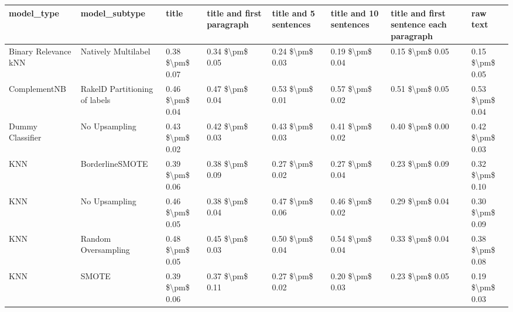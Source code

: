 \begin{tabular}{llllllll}
\toprule
                     model\_type &                 model\_subtype &           title & title and first paragraph & title and 5 sentences & title and 10 sentences & title and first sentence each paragraph &            raw text \\
\midrule
           Binary Relevance kNN &           Natively Multilabel & 0.38 \$\textbackslash pm\$ 0.07 &           0.34 \$\textbackslash pm\$ 0.05 &       0.24 \$\textbackslash pm\$ 0.03 &        0.19 \$\textbackslash pm\$ 0.04 &                         0.15 \$\textbackslash pm\$ 0.05 &     0.15 \$\textbackslash pm\$ 0.05 \\
                   ComplementNB & RakelD Partitioning of labels & 0.46 \$\textbackslash pm\$ 0.04 &           0.47 \$\textbackslash pm\$ 0.04 &       0.53 \$\textbackslash pm\$ 0.01 &        0.57 \$\textbackslash pm\$ 0.02 &                         0.51 \$\textbackslash pm\$ 0.05 &     0.53 \$\textbackslash pm\$ 0.04 \\
               Dummy Classifier &                 No Upsampling & 0.43 \$\textbackslash pm\$ 0.02 &           0.42 \$\textbackslash pm\$ 0.03 &       0.43 \$\textbackslash pm\$ 0.03 &        0.41 \$\textbackslash pm\$ 0.02 &                         0.40 \$\textbackslash pm\$ 0.00 &     0.42 \$\textbackslash pm\$ 0.03 \\
                            KNN &               BorderlineSMOTE & 0.39 \$\textbackslash pm\$ 0.06 &           0.38 \$\textbackslash pm\$ 0.09 &       0.27 \$\textbackslash pm\$ 0.02 &        0.27 \$\textbackslash pm\$ 0.04 &                         0.23 \$\textbackslash pm\$ 0.09 &     0.32 \$\textbackslash pm\$ 0.10 \\
                            KNN &                 No Upsampling & 0.46 \$\textbackslash pm\$ 0.05 &           0.38 \$\textbackslash pm\$ 0.04 &       0.47 \$\textbackslash pm\$ 0.06 &        0.46 \$\textbackslash pm\$ 0.02 &                         0.29 \$\textbackslash pm\$ 0.04 &     0.30 \$\textbackslash pm\$ 0.09 \\
                            KNN &           Random Oversampling & 0.48 \$\textbackslash pm\$ 0.05 &           0.45 \$\textbackslash pm\$ 0.03 &       0.50 \$\textbackslash pm\$ 0.04 &        0.54 \$\textbackslash pm\$ 0.04 &                         0.33 \$\textbackslash pm\$ 0.04 &     0.38 \$\textbackslash pm\$ 0.08 \\
                            KNN &                         SMOTE & 0.39 \$\textbackslash pm\$ 0.06 &           0.37 \$\textbackslash pm\$ 0.11 &       0.27 \$\textbackslash pm\$ 0.02 &        0.20 \$\textbackslash pm\$ 0.03 &                         0.23 \$\textbackslash pm\$ 0.05 &     0.19 \$\textbackslash pm\$ 0.03 \\

\end{tabular}
